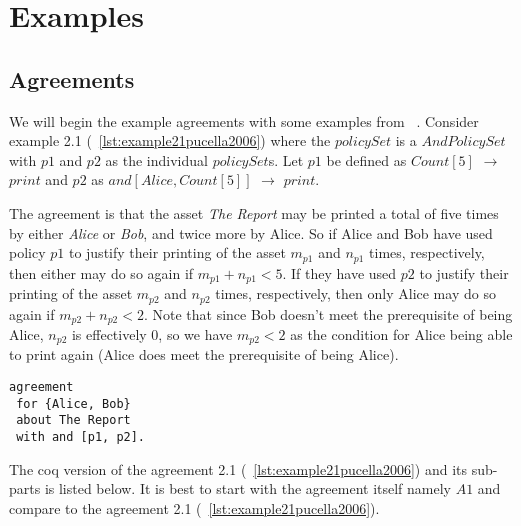 \chapter{Examples}

\section{Agreements}


We will begin the example agreements with some examples from ~\cite{pucella2006}. Consider example 2.1 (~\ref{lst:example21pucella2006}) where the $policySet$ is a $AndPolicySet$ with $p1$ and $p2$ as the individual $policySet$s. Let $p1$ be defined as $Count[5]$ $\rightarrow$ $print$ and $p2$ as $and[Alice, Count[5]]$ $\rightarrow$ $print$. 

The agreement is that the asset \emph{The Report} may be printed a total of five times by either \emph{Alice} or \emph{Bob}, and twice more by Alice. So if Alice and Bob have used policy $p1$ to justify their printing of the asset $m_{p1}$ and $n_{p1}$ times, respectively, then either may do so again if $m_{p1} + n_{p1} < 5$. If they have used $p2$ to justify their printing of the asset $m_{p2}$ and $n_{p2}$ times, respectively, then only Alice may do so again if $m_{p2} + n_{p2} < 2$. Note that since Bob doesn't meet the prerequisite of being Alice, $n_{p2}$ is effectively $0$, so we have $m_{p2} < 2$ as the condition for Alice being able to print again (Alice does meet the prerequisite of being Alice).

\lstset{language=Pucella2006}
\begin{lstlisting}[frame=single, caption={Agreement 2.1 (as used in ~\cite{pucella2006})},label={lst:example21pucella2006}]
agreement
 for {Alice, Bob} 
 about The Report 
 with and [p1, p2].
\end{lstlisting}

The coq version of the agreement 2.1 (~\ref{lst:example21pucella2006}) and its sub-parts is listed below. It is best to start with the agreement itself namely $A1$ and compare to the agreement 2.1 (~\ref{lst:example21pucella2006}).


